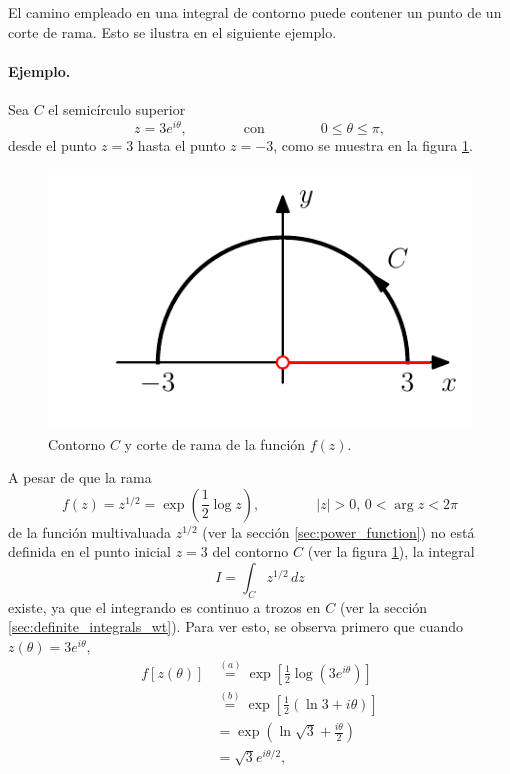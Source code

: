 \documentclass[a4paper]{report}
\begin{document}
El camino empleado en una integral de contorno puede contener un punto de un corte de rama. Esto se ilustra en el siguiente ejemplo.

\paragraph{Ejemplo.} Sea \(C\) el semicírculo superior 
\[
 z=3e^{i\theta},
 \qquad\qquad\textrm{con}\qquad\qquad 0\leq\theta\leq\pi,
\]
desde el punto \(z=3\) hasta el punto \(z=-3\), como se muestra en la figura \ref{fig:example_46_01}. 
\begin{figure}[!htb]
  \begin{minipage}[c]{0.35\textwidth}
    \includegraphics[width=\textwidth]{figuras/example_46_01.pdf}
  \end{minipage}\hfill
  \begin{minipage}[c]{0.55\textwidth}
    \caption{
        Contorno \(C\) y corte de rama de la función \(f(z)\).
    }\label{fig:example_46_01}
  \end{minipage}
\end{figure}
A pesar de que la rama
\[
 f(z)=z^{1/2}=\exp\left(\frac{1}{2}\log z\right),
 \qquad\qquad
 |z|>0,\,0<\arg z<2\pi
\]
de la función multivaluada \(z^{1/2}\) (ver la sección \ref{sec:power_function}) no está definida en el punto inicial \(z=3\) del contorno \(C\) (ver la figura \ref{fig:example_46_01}), la integral 
\[
 I=\int_C z^{1/2}\,dz
\]
existe, ya que el integrando es continuo a trozos en \(C\) (ver la sección \ref{sec:definite_integrals_wt}). Para ver esto, se observa primero que cuando \(z(\theta)=3e^{i\theta}\),
\begin{align*}
 f[z(\theta)]&\overset{(a)}{=}\exp\left[\frac{1}{2}\log(3e^{i\theta})\right]\\
  &\overset{(b)}{=}\exp\left[\frac{1}{2}(\ln 3+i\theta)\right]\\
  &=\exp\left(\ln\sqrt{3}+\frac{i\theta}{2}\right)\\
  &=\sqrt{3}e^{i\theta/2},
\end{align*}
\end{document}
